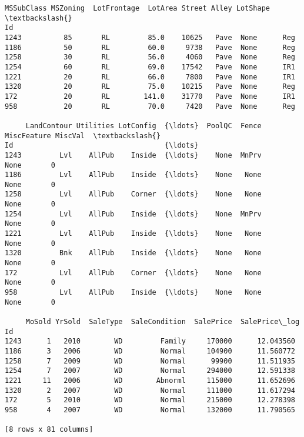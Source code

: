\documentclass[11pt]{article}
\makeatletter
\newcommand{\boxspacing}{\kern\kvtcb@left@rule\kern\kvtcb@boxsep}
\newcommand{\prompt}[4]{
        {\ttfamily\llap{{\color{#2}[#3]:\hspace{3pt}#4}}\vspace{-\baselineskip}}
    }
\makeatother
\begin{document}
            \begin{tcolorbox}[breakable, size=fbox, boxrule=.5pt, pad at break*=1mm, opacityfill=0]
\prompt{Out}{outcolor}{14}{\boxspacing}
\begin{Verbatim}[commandchars=\\\{\}]
      MSSubClass MSZoning  LotFrontage  LotArea Street Alley LotShape  \textbackslash{}
Id
1243          85       RL         85.0    10625   Pave  None      Reg
1186          50       RL         60.0     9738   Pave  None      Reg
1258          30       RL         56.0     4060   Pave  None      Reg
1254          60       RL         69.0    17542   Pave  None      IR1
1221          20       RL         66.0     7800   Pave  None      IR1
1320          20       RL         75.0    10215   Pave  None      Reg
172           20       RL        141.0    31770   Pave  None      IR1
958           20       RL         70.0     7420   Pave  None      Reg

     LandContour Utilities LotConfig  {\ldots}  PoolQC  Fence MiscFeature MiscVal  \textbackslash{}
Id                                    {\ldots}
1243         Lvl    AllPub    Inside  {\ldots}    None  MnPrv        None       0
1186         Lvl    AllPub    Inside  {\ldots}    None   None        None       0
1258         Lvl    AllPub    Corner  {\ldots}    None   None        None       0
1254         Lvl    AllPub    Inside  {\ldots}    None  MnPrv        None       0
1221         Lvl    AllPub    Inside  {\ldots}    None   None        None       0
1320         Bnk    AllPub    Inside  {\ldots}    None   None        None       0
172          Lvl    AllPub    Corner  {\ldots}    None   None        None       0
958          Lvl    AllPub    Inside  {\ldots}    None   None        None       0

     MoSold YrSold  SaleType  SaleCondition  SalePrice  SalePrice\_log
Id
1243      1   2010        WD         Family     170000      12.043560
1186      3   2006        WD         Normal     104900      11.560772
1258      7   2009        WD         Normal      99900      11.511935
1254      7   2007        WD         Normal     294000      12.591338
1221     11   2006        WD        Abnorml     115000      11.652696
1320      2   2007        WD         Normal     111000      11.617294
172       5   2010        WD         Normal     215000      12.278398
958       4   2007        WD         Normal     132000      11.790565

[8 rows x 81 columns]
\end{Verbatim}
\end{tcolorbox}
        
\end{document}
